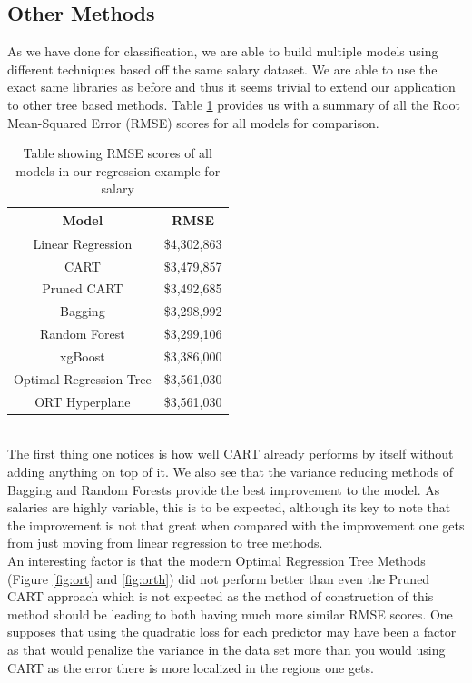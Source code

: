 \documentclass[11pt,a4paper]{report}
\begin{document}
\subsection{Other Methods}
As we have done for classification, we are able to build multiple models using different techniques based off the same salary dataset.
We are able to use the exact same libraries as before and thus it seems trivial to extend our application to other tree based methods.
Table \ref{tab:allreg} provides us with a summary of all the Root Mean-Squared Error (RMSE) scores for all models for comparison.
\begin{table}
    \centering
    \begin{tabular}{|c|c|}
        \hline
        \textbf{Model} & \textbf{RMSE} \\
        \hline
        Linear Regression & \$4,302,863 \\
        \hline
        CART & \$3,479,857 \\
        \hline
        Pruned CART & \$3,492,685 \\
        \hline
        Bagging & \$3,298,992 \\
        \hline
        Random Forest & \$3,299,106 \\
        \hline
        xgBoost & \$3,386,000 \\ 
        \hline
        Optimal Regression Tree & \$3,561,030 \\
        \hline
        ORT Hyperplane & \$3,561,030 \\
        \hline
    \end{tabular}
    \caption{Table showing RMSE scores of all models in our regression example for salary}
    \label{tab:allreg}
\end{table}
\medskip\\
The first thing one notices is how well CART already performs by itself without adding anything on top of it.
We also see that the variance reducing methods of Bagging and Random Forests provide the best improvement to the model.
As salaries are highly variable, this is to be expected, although its key to note that the improvement is not that great when compared with the improvement one gets from just moving from linear regression to tree methods.
\medskip\\
An interesting factor is that the modern Optimal Regression Tree Methods (Figure \ref{fig:ort} and \ref{fig:orth}) did not perform better than even the Pruned CART approach which is not expected as the method of construction of this method should be leading to both having much more similar RMSE scores. One supposes that using the quadratic loss for each predictor may have been a factor as that would penalize the variance in the data set more than you would using CART as the error there is more localized in the regions one gets.
\end{document}
